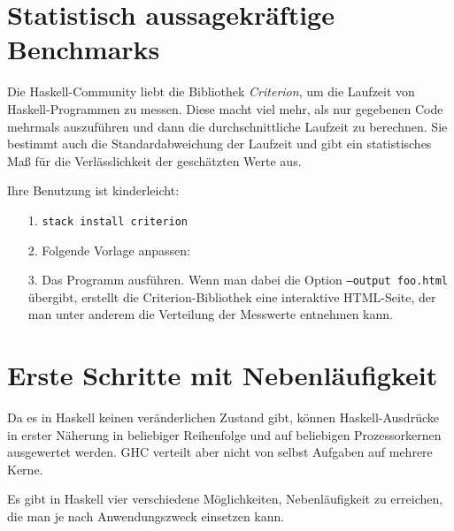 \documentclass{uebblatt}
\begin{document}
\section{Statistisch aussagekräftige Benchmarks}

Die Haskell-Community liebt die Bibliothek \emph{Criterion}, um die Laufzeit
von Haskell-Programmen zu messen. Diese macht viel mehr, als nur gegebenen Code
mehrmals auszuführen und dann die durchschnittliche Laufzeit zu berechnen. Sie
bestimmt auch die Standardabweichung der Laufzeit und gibt ein statistisches
Maß für die Verlässlichkeit der geschätzten Werte aus.

Ihre Benutzung ist kinderleicht:

\begin{enumerate}
\item[1.] \texttt{stack install criterion}
\item[2.] Folgende Vorlage anpassen:


\item[3.] Das Programm ausführen. Wenn man dabei die Option \texttt{--output
foo.html} übergibt, erstellt die Criterion-Bibliothek eine interaktive
HTML-Seite, der man unter anderem die Verteilung der Messwerte entnehmen kann.
\end{enumerate}


\section{Erste Schritte mit Nebenläufigkeit}

Da es in Haskell keinen veränderlichen Zustand gibt, können Haskell-Ausdrücke
in erster Näherung in beliebiger Reihenfolge und auf beliebigen Prozessorkernen
ausgewertet werden. GHC verteilt aber nicht von selbst Aufgaben auf mehrere
Kerne.

Es gibt in Haskell vier verschiedene Möglichkeiten, Nebenläufigkeit zu
erreichen, die man je nach Anwendungszweck einsetzen kann.
\end{document}
